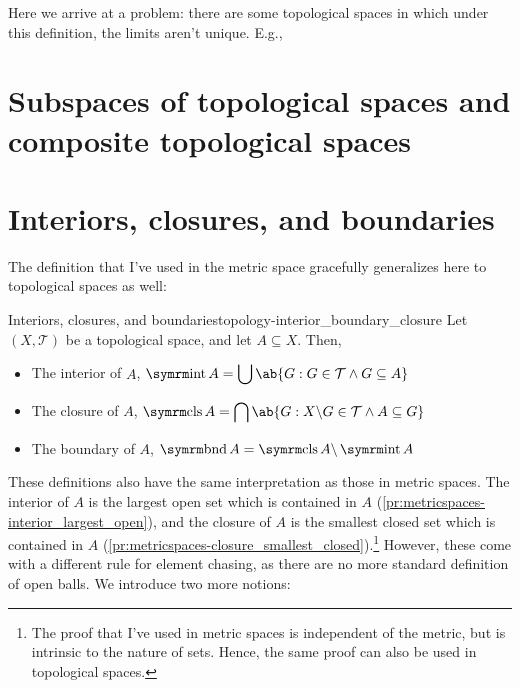 Here we arrive at a problem: there are some topological spaces in which under this
definition, the limits aren't unique. E.g.,

\section{Subspaces of topological spaces and composite topological spaces}

\section{Interiors, closures, and boundaries}

The definition that I've used in the metric space gracefully generalizes here to
topological spaces as well:
\begin{df}{Interiors, closures, and boundaries}{topology-interior_boundary_closure}
  Let \((X, \mathcal{T})\) be a topological space, and let \(A \subseteq X\). Then,
   
  \begin{itemize}
    \item The interior of \(A\),
          \(\displaystyle\intr A = \bigcup \ab\{G : G \in \mathcal{T} \land G \subseteq A\}\)
    \item The closure of \(A\),
          \(\displaystyle\clos A = \bigcap \ab\{G : X \smin G \in \mathcal{T} \land A \subseteq G\}\)
    \item The boundary of \(A\), \(\bnd A = \clos A \smin \intr A\)
  \end{itemize}
\end{df}

These definitions also have the same interpretation as those in metric spaces. The interior of \(A\)
is the largest open set which is contained in \(A\) (\cref{pr:metricspaces-interior_largest_open}),
and the closure of \(A\) is the smallest closed set which is contained in \(A\)
(\cref{pr:metricspaces-closure_smallest_closed}).\footnote{The proof that I've used in
metric spaces is independent of the metric, but is intrinsic to the nature of sets. Hence, the same
proof can also be used in topological spaces.} However, these come with a different rule for element
chasing, as there are no more standard definition of open balls. We introduce two more notions:

